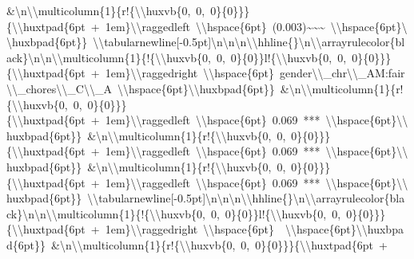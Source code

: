\documentclass[
  english,
  man]{apa6}
\begin{document}
\&\textbackslash{}n\textbackslash{}\textbackslash{}multicolumn\{1\}\{r!\{\textbackslash{}\textbackslash{}huxvb\{0,\ 0,\ 0\}\{0\}\}\}\{\textbackslash{}\textbackslash{}huxtpad\{6pt\ +\ 1em\}\textbackslash{}\textbackslash{}raggedleft\ \textbackslash{}\textbackslash{}hspace\{6pt\}\ (0.003)\textasciitilde{}\textasciitilde{}\textasciitilde{}\ \textbackslash{}\textbackslash{}hspace\{6pt\}\textbackslash{}\textbackslash{}huxbpad\{6pt\}\}\ \textbackslash{}\textbackslash{}tabularnewline{[}-0.5pt{]}\textbackslash{}n\textbackslash{}n\textbackslash{}n\textbackslash{}\textbackslash{}hhline\{\}\textbackslash{}n\textbackslash{}\textbackslash{}arrayrulecolor\{black\}\textbackslash{}n\textbackslash{}n\textbackslash{}\textbackslash{}multicolumn\{1\}\{!\{\textbackslash{}\textbackslash{}huxvb\{0,\ 0,\ 0\}\{0\}\}l!\{\textbackslash{}\textbackslash{}huxvb\{0,\ 0,\ 0\}\{0\}\}\}\{\textbackslash{}\textbackslash{}huxtpad\{6pt\ +\ 1em\}\textbackslash{}\textbackslash{}raggedright\ \textbackslash{}\textbackslash{}hspace\{6pt\}\ gender\textbackslash{}\textbackslash{}\_chr\textbackslash{}\textbackslash{}\_AM:fair\textbackslash{}\textbackslash{}\_chores\textbackslash{}\textbackslash{}\_C\textbackslash{}\textbackslash{}\_A\ \textbackslash{}\textbackslash{}hspace\{6pt\}\textbackslash{}\textbackslash{}huxbpad\{6pt\}\}\ \&\textbackslash{}n\textbackslash{}\textbackslash{}multicolumn\{1\}\{r!\{\textbackslash{}\textbackslash{}huxvb\{0,\ 0,\ 0\}\{0\}\}\}\{\textbackslash{}\textbackslash{}huxtpad\{6pt\ +\ 1em\}\textbackslash{}\textbackslash{}raggedleft\ \textbackslash{}\textbackslash{}hspace\{6pt\}\ 0.069\ ***\ \textbackslash{}\textbackslash{}hspace\{6pt\}\textbackslash{}\textbackslash{}huxbpad\{6pt\}\}\ \&\textbackslash{}n\textbackslash{}\textbackslash{}multicolumn\{1\}\{r!\{\textbackslash{}\textbackslash{}huxvb\{0,\ 0,\ 0\}\{0\}\}\}\{\textbackslash{}\textbackslash{}huxtpad\{6pt\ +\ 1em\}\textbackslash{}\textbackslash{}raggedleft\ \textbackslash{}\textbackslash{}hspace\{6pt\}\ 0.069\ ***\ \textbackslash{}\textbackslash{}hspace\{6pt\}\textbackslash{}\textbackslash{}huxbpad\{6pt\}\}\ \&\textbackslash{}n\textbackslash{}\textbackslash{}multicolumn\{1\}\{r!\{\textbackslash{}\textbackslash{}huxvb\{0,\ 0,\ 0\}\{0\}\}\}\{\textbackslash{}\textbackslash{}huxtpad\{6pt\ +\ 1em\}\textbackslash{}\textbackslash{}raggedleft\ \textbackslash{}\textbackslash{}hspace\{6pt\}\ 0.069\ ***\ \textbackslash{}\textbackslash{}hspace\{6pt\}\textbackslash{}\textbackslash{}huxbpad\{6pt\}\}\ \textbackslash{}\textbackslash{}tabularnewline{[}-0.5pt{]}\textbackslash{}n\textbackslash{}n\textbackslash{}n\textbackslash{}\textbackslash{}hhline\{\}\textbackslash{}n\textbackslash{}\textbackslash{}arrayrulecolor\{black\}\textbackslash{}n\textbackslash{}n\textbackslash{}\textbackslash{}multicolumn\{1\}\{!\{\textbackslash{}\textbackslash{}huxvb\{0,\ 0,\ 0\}\{0\}\}l!\{\textbackslash{}\textbackslash{}huxvb\{0,\ 0,\ 0\}\{0\}\}\}\{\textbackslash{}\textbackslash{}huxtpad\{6pt\ +\ 1em\}\textbackslash{}\textbackslash{}raggedright\ \textbackslash{}\textbackslash{}hspace\{6pt\}\ \ \textbackslash{}\textbackslash{}hspace\{6pt\}\textbackslash{}\textbackslash{}huxbpad\{6pt\}\}\ \&\textbackslash{}n\textbackslash{}\textbackslash{}multicolumn\{1\}\{r!\{\textbackslash{}\textbackslash{}huxvb\{0,\ 0,\ 0\}\{0\}\}\}\{\textbackslash{}\textbackslash{}huxtpad\{6pt\ +\ 
\end{document}
